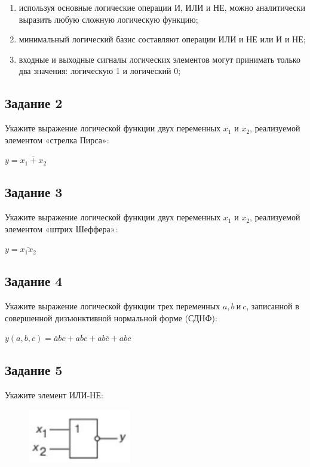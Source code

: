 \documentclass[bachelor, och, labwork]{shiza}
\begin{document}
    \begin{enumerate}
        \item используя основные логические операции И, ИЛИ и НЕ, можно аналитически
        выразить любую сложную логическую функцию;
        \item минимальный логический базис составляют операции ИЛИ и НЕ или И и НЕ;
        \item входные и выходные сигналы логических элементов могут принимать
        только два значения: логическую 1 и логический 0;
    \end{enumerate}


\subsection{Задание 2}
    Укажите выражение логической функции двух переменных $x_1$ и $x_2$, реализуемой элементом «стрелка Пирса»:
    
    \begin{center}$y = \overline{x_1 + x_2}$\end{center}

\subsection{Задание 3}
     Укажите выражение логической функции двух переменных $x_1$ и $x_2$, реализуемой элементом «штрих Шеффера»:
    
    \begin{center}$y = \overline{x_1x_2}$\end{center}
    
\subsection{Задание 4}
     Укажите выражение логической функции трех переменных $a, b ~\text{и}~ c$, 
     записанной в совершенной дизъюнктивной нормальной форме (СДНФ):

    \begin{center}$y(a, b, c) = \overline{a}bc + a\overline{b}c + ab\overline{c} + abc$\end{center}

\subsection{Задание 5}
    Укажите элемент ИЛИ-НЕ:
    
    \begin{figure}[H]
        \centering    
        \includegraphics[width=0.4\textwidth]{pic1/3.png}
    \end{figure}
\end{document}
